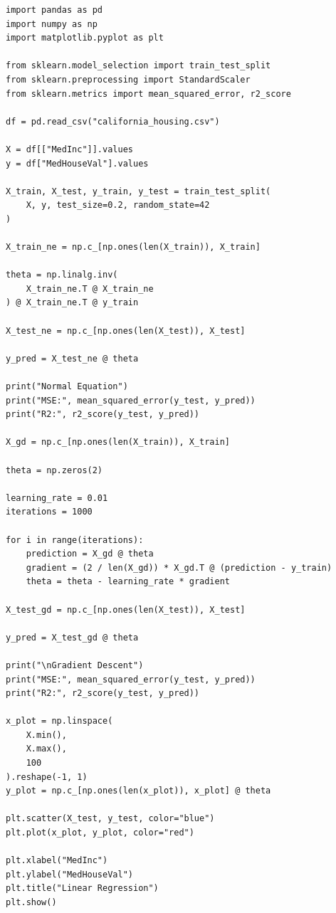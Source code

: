 \documentclass[12pt, a4paper]{article}
\begin{document}
\begin{lstlisting}
import pandas as pd
import numpy as np
import matplotlib.pyplot as plt

from sklearn.model_selection import train_test_split
from sklearn.preprocessing import StandardScaler
from sklearn.metrics import mean_squared_error, r2_score

df = pd.read_csv("california_housing.csv")

X = df[["MedInc"]].values
y = df["MedHouseVal"].values

X_train, X_test, y_train, y_test = train_test_split(
    X, y, test_size=0.2, random_state=42
)

X_train_ne = np.c_[np.ones(len(X_train)), X_train]

theta = np.linalg.inv(
    X_train_ne.T @ X_train_ne
) @ X_train_ne.T @ y_train

X_test_ne = np.c_[np.ones(len(X_test)), X_test]

y_pred = X_test_ne @ theta

print("Normal Equation")
print("MSE:", mean_squared_error(y_test, y_pred))
print("R2:", r2_score(y_test, y_pred))

X_gd = np.c_[np.ones(len(X_train)), X_train]

theta = np.zeros(2)

learning_rate = 0.01
iterations = 1000

for i in range(iterations):
    prediction = X_gd @ theta
    gradient = (2 / len(X_gd)) * X_gd.T @ (prediction - y_train)
    theta = theta - learning_rate * gradient

X_test_gd = np.c_[np.ones(len(X_test)), X_test]

y_pred = X_test_gd @ theta

print("\nGradient Descent")
print("MSE:", mean_squared_error(y_test, y_pred))
print("R2:", r2_score(y_test, y_pred))

x_plot = np.linspace(
    X.min(),
    X.max(),
    100
).reshape(-1, 1)
y_plot = np.c_[np.ones(len(x_plot)), x_plot] @ theta

plt.scatter(X_test, y_test, color="blue")
plt.plot(x_plot, y_plot, color="red")

plt.xlabel("MedInc")
plt.ylabel("MedHouseVal")
plt.title("Linear Regression")
plt.show()

\end{lstlisting}

\vspace{\baselineskip}
\end{document}
